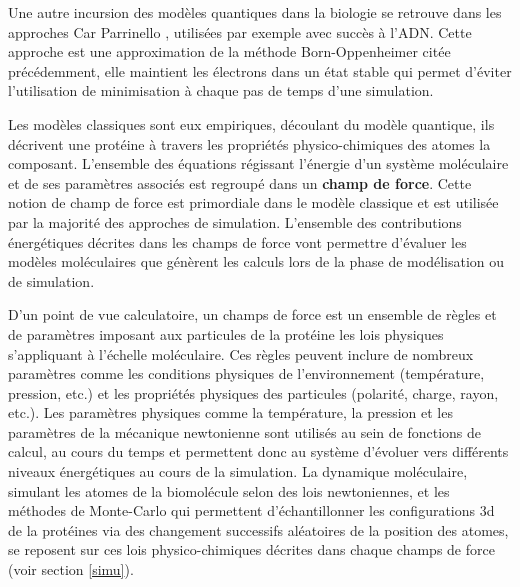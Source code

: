 Une autre incursion des modèles quantiques dans la biologie se retrouve dans les approches Car Parrinello \cite{car1985unified}, utilisées par exemple avec succès à l'ADN. Cette approche est une approximation de la méthode Born-Oppenheimer citée précédemment, elle maintient les électrons dans un état stable qui permet d'éviter l'utilisation de minimisation à chaque pas de temps d'une simulation.

 \label{forcefield}

Les modèles classiques sont eux empiriques, découlant du modèle quantique, ils décrivent une protéine à travers les propriétés physico-chimiques des atomes la composant. L'ensemble des équations régissant l'énergie d'un système moléculaire et de ses paramètres associés est regroupé dans un \textbf{champ de force}. Cette notion de champ de force est primordiale dans le modèle classique et est utilisée par la majorité des approches de simulation. L'ensemble des contributions énergétiques décrites dans les champs de force vont permettre d'évaluer les modèles moléculaires que génèrent les calculs lors de la phase de modélisation ou de simulation.

D'un point de vue calculatoire, un champs de force est un ensemble de règles et de paramètres imposant aux particules de la protéine les lois physiques s'appliquant à l'échelle moléculaire. Ces règles peuvent inclure de nombreux paramètres comme les conditions physiques de l'environnement (température, pression, etc.) et les propriétés physiques des particules (polarité, charge, rayon, etc.). Les paramètres physiques comme la température, la pression et les paramètres de la mécanique newtonienne sont utilisés au sein de fonctions de calcul, au cours du temps et permettent donc au système d'évoluer vers différents niveaux énergétiques au cours de la simulation. La dynamique moléculaire, simulant les atomes de la biomolécule selon des lois newtoniennes, 
et les méthodes de Monte-Carlo qui permettent d'échantillonner les configurations 3d de la protéines via des changement successifs aléatoires de la position des atomes, se reposent sur ces lois physico-chimiques décrites dans chaque champs de force (voir section \ref{simu}). 


